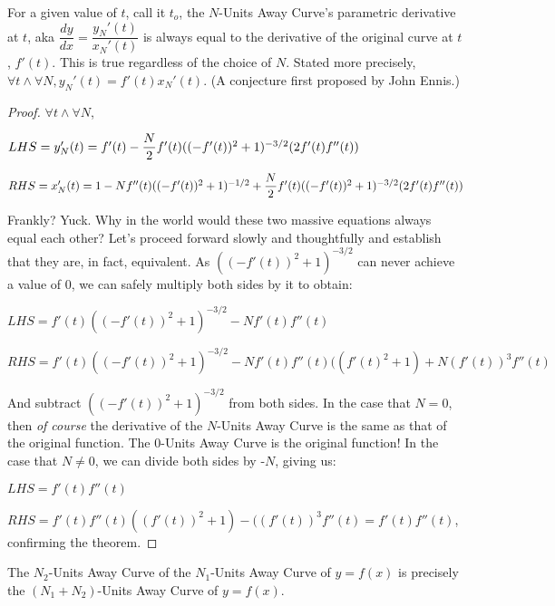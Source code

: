 \begin{myTrm}
    For a given value of $t$, call it $t_o$, the $N$-Units Away Curve’s parametric derivative at $t$, aka $\dfrac{dy}{dx} = \dfrac{y_N'(t)}{x_N'(t)}$ is always equal to the derivative of the original curve at $t$, $f'(t)$. This is true regardless of the choice of $N$. Stated more precisely, $\forall t \land \forall N, y_N'(t) = f'(t) x_N'(t)$. (A conjecture first proposed by John Ennis.)
\end{myTrm}

\begin{proof}

$\forall t \land \forall N$,

$LHS = y_N'(t) = f'(t) - \dfrac{N}{2} f'(t) ((-f'(t))^2 + 1) ^ {-3/2} (2 f'(t) f''(t))$

$RHS = x_N'(t) = 1 - N f''(t) ((-f'(t))^2 + 1)^{-1/2} + \dfrac{N}{2} f'(t) ( (-f'(t))^2 + 1) ^ {-3/2} (2 f'(t) f''(t))$

Frankly? Yuck. Why in the world would these two massive equations always equal each other? Let’s proceed forward slowly and thoughtfully and establish that they are, in fact, equivalent. As $((-f'(t))^2 + 1) ^ {-3/2}$ can never achieve a value of 0, we can safely multiply both sides by it to obtain:

$LHS = f'(t) ((-f'(t))^2 + 1) ^ {-3/2} - N f'(t) f''(t) $

$RHS = f'(t) ((-f'(t))^2 + 1) ^ {-3/2} - N f'(t) f''(t) ((f'(t) ^ 2 + 1) + N (f'(t))^3 f''(t)$

And subtract $((-f'(t))^2 + 1) ^ {-3/2}$ from both sides. In the case that $N = 0$, then \textit{of course} the derivative of the $N$-Units Away Curve is the same as that of the original function. The $0$-Units Away Curve is the original function! In the case that $N \neq 0$, we can divide both sides by -$N$, giving us:

$LHS = f'(t)f''(t)$

$RHS = f'(t)f''(t) ((f'(t))^2 + 1) - ((f'(t))^3 f''(t) = f'(t)f''(t)$, confirming the theorem.

\end{proof}

\begin{myTrm}
    The $N_2$-Units Away Curve of the $N_1$-Units Away Curve of $y = f(x)$ is precisely the $(N_1 + N_2)$-Units Away Curve of $y=f(x)$.
\end{myTrm}

